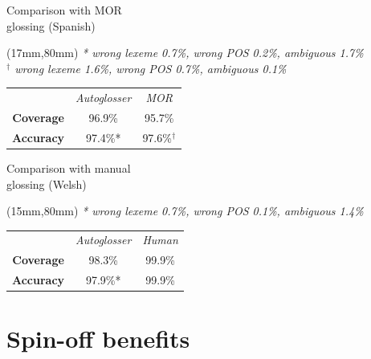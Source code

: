 \documentclass[hyperref={pdfpagelabels=false}, 14pt]{beamer}
\newenvironment{reference}[2]{%
  \begin{textblock*}{\textwidth}(#1,#2) 
      \footnotesize\it\bgroup\color{ESRCred}}{\egroup\end{textblock*}}
\begin{document}
\begin{frame}{Comparison with MOR  \\ glossing (Spanish)}
\begin{reference}{17mm}{80mm}  %
    * wrong lexeme 0.7\%, wrong POS 0.2\%, ambiguous 1.7\%\\
    $^\dag$ wrong lexeme 1.6\%, wrong POS 0.7\%, ambiguous 0.1\%\\
\end{reference}
\begin{Large}
\begin{center}
\begin{tabular}{ccc}
& \textit{Autoglosser} & \textit{MOR} \\ 
\cline{1-3}\noalign{\smallskip}
\textbf{Coverage}     & \textcolor{ESRCred}{96.9\%} & \textcolor{ESRCblue}{95.7\%} \\
\textbf{Accuracy}    & \textcolor{ESRCred}{97.4\%*} & \textcolor{ESRCblue}{97.6\%$^\dag$} \\
\end{tabular}
\end{center}
\end{Large}
\end{frame}


\begin{frame}{Comparison with manual \\ glossing (Welsh)}
\begin{reference}{15mm}{80mm}  %
    * wrong lexeme 0.7\%, wrong POS 0.1\%, ambiguous 1.4\%\\
\end{reference}
\begin{Large}
\begin{center}
\begin{tabular}{ccc}
& \textit{Autoglosser} & \textit{Human} \\ 
\cline{1-3}\noalign{\smallskip}
\textbf{Coverage}     & \textcolor{ESRCred}{98.3\%} & \textcolor{ESRCblue}{99.9\%} \\
\textbf{Accuracy}    & \textcolor{ESRCred}{97.9\%*} & \textcolor{ESRCblue}{99.9\%} \\
\end{tabular}
\end{center}
\end{Large}
\end{frame}


\section{Spin-off benefits}
\end{document}
